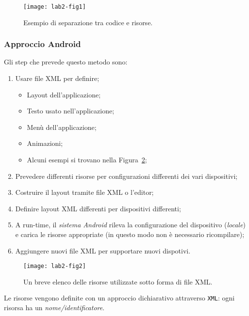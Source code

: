 \begin{figure}[htbp]
	\centering
	\texttt{[image: lab2-fig1]}
	\caption[Esempio di separazione tra codice e risorse]{Esempio di separazione tra codice e risorse.}\label{img:lab2-fig1}
\end{figure}

\subsubsection{Approccio Android}

Gli step che prevede questo metodo sono:

\begin{enumerate}
\item Usare file XML per definire;
\begin{itemize}
\item Layout dell'applicazione;
\item Testo usato nell'applicazione;
\item Menù dell'applicazione;
\item Animazioni;
\item Alcuni esempi si trovano nella Figura~\ref{img:lab2-fig2};
\end{itemize}
\item Prevedere differenti risorse per configurazioni differenti dei vari dispositivi;
\item Costruire il layout tramite file XML o l'editor;
\item Definire layout XML differenti per dispositivi differenti;
\item A run-time, il \textit{sistema Android} rileva la configurazione del dispositivo (\textit{locale}) e carica le risorse appropriate (in questo modo non è necessario ricompilare);
\item Aggiungere nuovi file XML per supportare nuovi dispotivi.
\end{enumerate}

\begin{figure}[htbp]
	\centering
	\texttt{[image: lab2-fig2]}
	\caption[Elenco risorse]{Un breve elenco delle risorse utilizzate sotto forma di file XML.}\label{img:lab2-fig2}
\end{figure}

Le risorse vengono definite con un approccio dichiarativo attraverso \texttt{XML}: ogni risorsa ha un \textit{nome/identificatore}.



